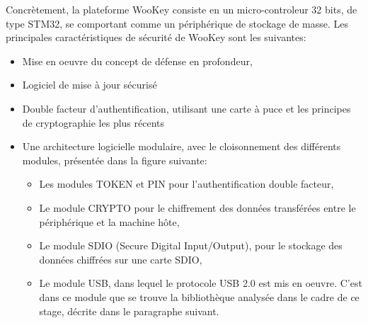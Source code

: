 Concrètement, la plateforme WooKey consiste en un micro-controleur 32 bits, de type STM32, se comportant comme un périphérique de stockage de masse. Les principales caractéristiques de sécurité de WooKey sont les suivantes:
\begin{itemize}
	\item Mise en oeuvre du concept de défense en profondeur,
	\item Logiciel de mise à jour sécurisé
	\item Double facteur d'authentification, utilisant une carte à puce et les principes de cryptographie les plus récents
	\item Une architecture logicielle modulaire, avec le cloisonnement des différents modules, présentée dans la figure suivante:
	\begin{itemize}
		\item Les modules TOKEN et PIN pour l'authentification double facteur,
		\item Le module CRYPTO pour le chiffrement des données transférées entre le périphérique et la machine hôte,
		\item Le module SDIO (Secure Digital Input/Output), pour le stockage des données chiffrées sur une carte SDIO,
		\item Le module USB, dans lequel le protocole USB 2.0 est mis en oeuvre. C'est dans ce module que se trouve la bibliothèque analysée dans le cadre de ce stage, décrite dans le paragraphe suivant.
	\end{itemize}
\end{itemize}




